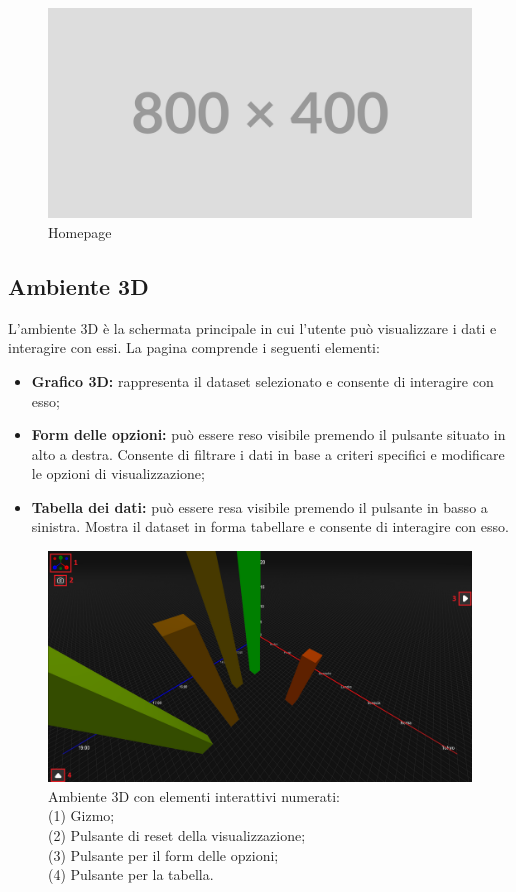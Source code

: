 \begin{figure}[ht!]
    \centering
    \includegraphics[scale=0.6]{template/images/placeholder.png}
    \caption{Homepage}
\end{figure}

\subsection{Ambiente 3D}
L'ambiente 3D è la schermata principale in cui l'utente può visualizzare i dati
e interagire con essi. La pagina comprende i seguenti elementi:
\begin{itemize}
    \item \textbf{Grafico 3D:} rappresenta il dataset selezionato e consente di
          interagire con esso;
    \item \textbf{Form delle opzioni:} può essere reso visibile premendo
          il pulsante situato in alto a destra. Consente di filtrare i dati in
          base a criteri specifici e modificare le opzioni di visualizzazione;
    \item \textbf{Tabella dei dati:} può essere resa visibile premendo il
          pulsante in basso a sinistra. Mostra il dataset in forma tabellare e
          consente di interagire con esso.
\end{itemize}
\begin{figure}[ht!]
    \centering
    \includegraphics[scale=0.29]{template/images/envpage.png}
    \caption{
        Ambiente 3D con elementi interattivi numerati:\\
        (1) Gizmo;\\
        (2) Pulsante di reset della visualizzazione;\\
        (3) Pulsante per il form delle opzioni;\\
        (4) Pulsante per la tabella.
    }
\end{figure}
